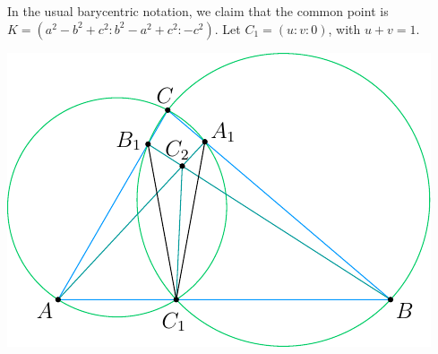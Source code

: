 \documentclass[11pt]{scrartcl}
\begin{document}
\begin{description}
  In the usual barycentric notation,
  we claim that the common point is $K = \left( a^2-b^2+c^2 : b^2-a^2+c^2 : -c^2 \right)$.
  Let $C_1 = (u:v:0)$, with $u+v=1$.
  \begin{center}
    \includegraphics{sharygin-figure.pdf}
  \end{center}


\end{description}
\end{document}
